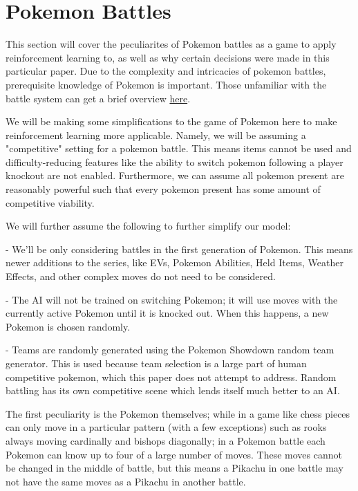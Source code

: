 \documentclass{article}
\begin{document}
\section{Pokemon Battles}
\label{sec:battles}

\quad	This section will cover the peculiarites of Pokemon battles as a game to apply reinforcement learning to, as well as why certain decisions were made in this particular paper. Due to the complexity and intricacies of pokemon battles, prerequisite knowledge of Pokemon is important. Those unfamiliar with the battle system can get a brief overview \href{https://bulbapedia.bulbagarden.net/wiki/Pokemon_battle}{here}.

\quad	We will be making some simplifications to the game of Pokemon here to make reinforcement learning more applicable. Namely, we will be assuming a "competitive" setting for a pokemon battle. This means items cannot be used and difficulty-reducing features like the ability to switch pokemon following a player knockout are not enabled. Furthermore, we can assume all pokemon present are reasonably powerful such that every pokemon present has some amount of competitive viability.

\quad	We will further assume the following to further simplify our model:

\quad	- We'll be only considering battles in the first generation of Pokemon. This means newer additions to the series, like EVs, Pokemon Abilities, Held Items, Weather Effects, and other complex moves do not need to be considered.

\quad - The AI will not be trained on switching Pokemon; it will use moves with the currently active Pokemon until it is knocked out. When this happens, a new Pokemon is chosen randomly.

\quad	- Teams are randomly generated using the Pokemon Showdown random team generator. This is used because team selection is a large part of human competitive pokemon, which this paper does not attempt to address. Random battling has its own competitive scene which lends itself much better to an AI.

\quad	The first peculiarity is the Pokemon themselves; while in a game like chess pieces can only move in a particular pattern (with a few exceptions) such as rooks always moving cardinally and bishops diagonally; in a Pokemon battle each Pokemon can know up to four of a large number of moves. These moves cannot be changed in the middle of battle, but this means a Pikachu in one battle may not have the same moves as a Pikachu in another battle.
\end{document}
